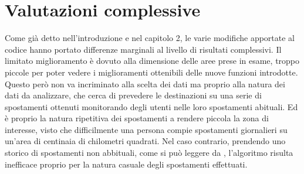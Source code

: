 \section{Valutazioni complessive}
Come gi\`a detto nell'introduzione e nel capitolo 2, le varie modifiche apportate
al codice hanno portato differenze marginali al livello di risultati complessivi.
Il limitato miglioramento \`e dovuto alla dimensione delle aree prese in esame, troppo
piccole per poter vedere i miglioramenti ottenibili delle nuove funzioni introdotte.\\
Questo per\`o non va incriminato alla scelta dei dati ma proprio alla natura dei
dati da analizzare, che cerca di prevedere le destinazioni su una serie di spostamenti
ottenuti monitorando degli utenti nelle loro spostamenti abituali. Ed \`e proprio la
natura ripetitiva dei spostamenti a rendere piccola la zona di interesse, visto che
difficilmente una persona compie spostamenti giornalieri su un'area di centinaia di
chilometri quadrati. Nel caso contrario, prendendo uno storico di spostamenti non
abbituali, come si pu\`o leggere da \cite{cit_49}, l'algoritmo risulta inefficace
proprio per la natura casuale degli spostamenti effettuati.
